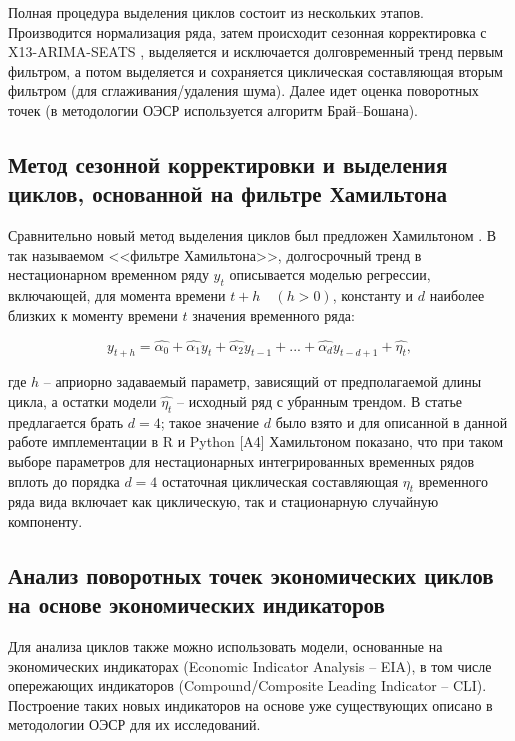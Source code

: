 \documentclass[../report.tex]{subfiles}
\begin{document}
	Полная процедура выделения циклов состоит из нескольких этапов. Производится нормализация ряда, затем происходит сезонная корректировка с X13-ARIMA-SEATS \cite{seasonalManual}, выделяется и исключается долговременный тренд первым фильтром, а потом выделяется и сохраняется циклическая составляющая вторым фильтром (для сглаживания/удаления шума). Далее идет оценка поворотных точек (в методологии ОЭСР \cite{oecdCycleExtraction} используется алгоритм Брай–Бошана).
	
	\subsection{Метод сезонной корректировки и выделения циклов, основанной на фильтре Хамильтона}
	
	Сравнительно новый метод выделения циклов был предложен Хамильтоном \cite{hamNewApproach}. В так называемом <<фильтре Хамильтона>>, долгосрочный тренд в нестационарном временном ряду $y_t$  описывается моделью регрессии, включающей, для момента времени  $t+h \quad (h>0)$, константу и $d$ наиболее близких к моменту времени $t$ значения временного ряда:
	
	\begin{equation}
	y_{t+h} = \hat{\alpha_{0}} + \hat{\alpha_{1}}y_{t} + \hat{\alpha_{2}}y_{t-1}
	+ ... + \hat{\alpha_{d}}y_{t-d+1} + \hat{\eta_{t}},
	\end{equation}
	
	где $h$ – априорно задаваемый параметр, зависящий от предполагаемой длины цикла, а остатки модели $\hat{\eta_{t}}$ – исходный ряд с убранным трендом. В статье предлагается брать $d=4$; такое значение $d$ было взято и для описанной в данной работе имплементации в R и Python [A4] \iffalse \cite{makarevich_bsu_conf_2017}.\fi Хамильтоном показано, что при таком выборе параметров для нестационарных интегрированных временных рядов вплоть до порядка $d=4$ остаточная циклическая составляющая $\eta_{t}$ временного ряда вида включает как циклическую, так и стационарную случайную компоненту. 
	
	
	\subsection{Анализ поворотных точек экономических циклов на основе экономических индикаторов}
	
	Для анализа циклов также можно использовать модели, основанные на экономических индикаторах (Economic Indicator Analysis – EIA), в том числе опережающих индикаторов (Compound/Composite Leading Indicator – CLI). Построение таких новых индикаторов на основе уже существующих описано в методологии ОЭСР \cite{oecdCLI} для их исследований. 
	
\end{document}
